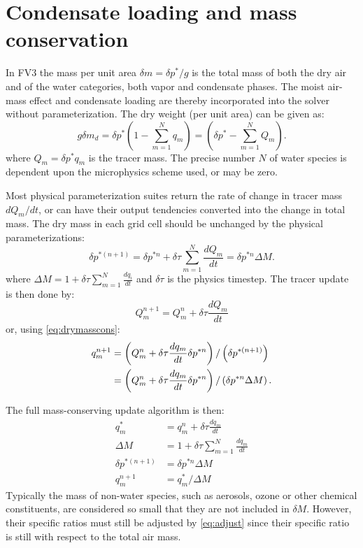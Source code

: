 \documentclass[10pt,letterpaper,margin=1in]{memoir}
\begin{document}
\section{Condensate loading and mass conservation} \label{sec:condloading}

In FV3 the mass per unit area $\delta m = \delta p^*/g$ is the total mass of both the dry air and of the water categories, both vapor and condensate phases. The moist air-mass effect and condensate loading are thereby incorporated into the solver without parameterization. The dry weight (per unit area) can be given as:
\begin{equation}
g \delta m_d = \delta p^* \left ( 1 - \sum_{m=1}^N q_m \right ) = \left ( \delta p^* - \sum_{m=1}^N Q_m \right ).
\end{equation}
where $Q_m = \delta p^* q_m$ is the tracer mass. The precise number $N$ of water species is dependent upon the microphysics scheme used, or may be zero. 

Most physical parameterization suites return the rate of change in tracer mass $dQ_m/dt$, or can have their output tendencies converted into the change in total mass. 
The dry mass in each grid cell should be unchanged by the physical parameterizations:
\begin{equation} \label{eq:drymasscons}
\delta p^{*(n+1)} = \delta p^{*n} + \delta \tau  \sum_{m=1}^N \frac{dQ_m}{dt} = \delta p^{*n} \Delta M.
\end{equation}
where $\Delta M = 1 + \delta \tau \sum_{m=1}^N \frac{dq_i}{dt}$ and $\delta \tau$ is the physics timestep. The tracer update is then done by:
\begin{equation}
Q^{n+1}_m = Q^n_m + \delta \tau \frac{dQ_m}{dt}
\end{equation}
or, using \eqref{eq:drymasscons}:
\begin{align}
q^{n+1}_m &=  \left( Q^n_m + \delta \tau \frac{dq_m}{dt} \delta p^{*n} \right) / \left( \delta p^{*(n+1)} \right) \notag \\
&= \left( Q^n_m + \delta \tau \frac{dq_m}{dt} \delta p^{*n} \right) / \left( \delta p^{*n} \Delta M \right).
\end{align}

The full mass-conserving update algorithm is then:
\begin{subequations}
\begin{align}
q_m^* &= q_m^{n} + \delta \tau \frac{dq_m}{dt} \\
\Delta M &= 1 + \delta \tau \sum_{m=1}^N  \frac{dq_m}{dt}  \\
\delta p^{*(n+1)} &= \delta p^{*n} \Delta M \\
q_m^{n+1} &= q_m^{*} / \Delta M \label{eq:adjust}
\end{align}
\end{subequations}
Typically the mass of non-water species, such as aerosols, ozone or other chemical constituents, are considered so small that they are not included in $\delta M$. However, their specific ratios must still be adjusted by \eqref{eq:adjust} since their specific ratio is still with respect to the total air mass.
\end{document}
